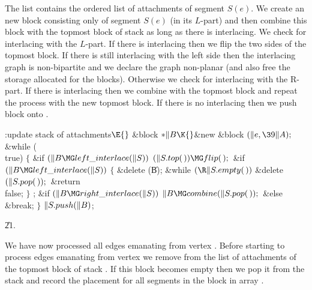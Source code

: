 The list  contains the ordered list of attachments of segment
$S(e)$. We create an new block consisting only of segment $S(e)$ (in its
$L$-part) and then combine this block with the topmost block of stack 
as
long as
there is interlacing. We check for interlacing with the $L$-part. If there
is interlacing then we flip the two sides of the topmost block. If there
is still interlacing with the left side then the interlacing graph is
non-bipartite and
we declare the graph non-planar (and also free the storage allocated
for the blocks). Otherwise we check for interlacing with
the R-part. If there is interlacing then we combine  with the topmost
block and repeat the process with the new topmost block. If there is no
interlacing then we push block  onto .



\Y\B\4:update stack  of attachments\X${}\E{}$\6
\&{block} ${}{*}\|B\K{}$\&{new} \&{block} ${}(\|e,\39\|A);{}$\7
\&{while} (\\{true})\5
${}\{{}$\1\6
\&{if} ${}(\|B\MG\\{left\_interlace}(\|S)){}$\1\5
${}(\|S.\\{top}(\,))\MG\\{flip}(\,);{}$\2\6
\&{if} ${}(\|B\MG\\{left\_interlace}(\|S)){}$\5
${}\{{}$\1\6
\&{delete} (\|B);\6
\&{while} ${}(\R\|S.\\{empty}(\,)){}$\1\5
\&{delete} ${}(\|S.\\{pop}(\,));{}$\2\6
\&{return} \\{false};\6
\4${}\}{}$\2\6
;\6
\&{if} ${}(\|B\MG\\{right\_interlace}(\|S)){}$\1\5
${}\|B\MG\\{combine}(\|S.\\{pop}(\,));{}$\2\6
\&{else}\1\5
\&{break};\2\6
\4${}\}{}$\2\6
${}\|S.\\{push}(\|B){}$;\par
\U21.\fi

We have now processed all edges emanating from vertex . Before
starting to
process edges emanating from vertex  we remove  from
the list of attachments of the topmost block of stack . If this block
becomes empty then we pop it from the stack and record the placement for all
segments in the block in array .

